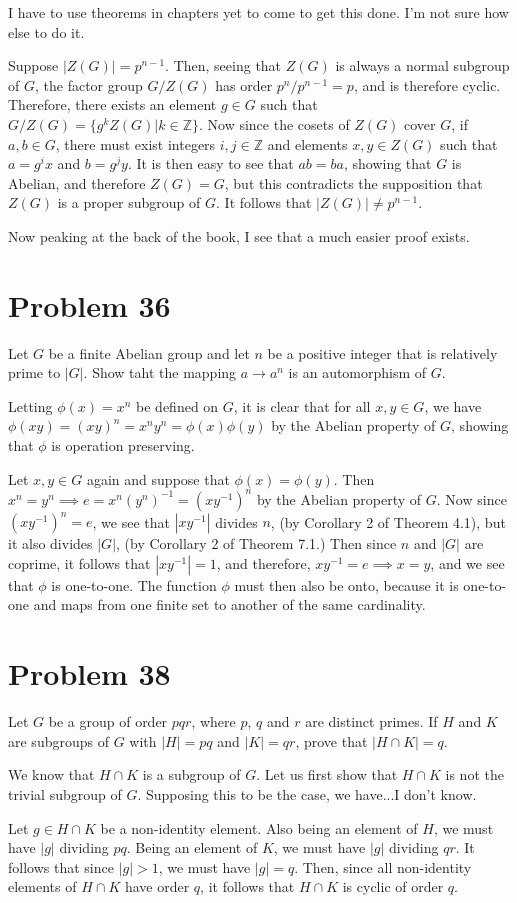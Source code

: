 \documentclass[12pt]{article}
\newcommand{\Z}{\mathbb{Z}}
\begin{document}
I have to use theorems in chapters yet to come to get this done.  I'm not sure
how else to do it.

Suppose $|Z(G)|=p^{n-1}$.  Then, seeing that $Z(G)$ is always
a normal subgroup of $G$, the factor group $G/Z(G)$ has
order $p^n/p^{n-1}=p$, and is therefore cyclic.
Therefore, there exists an element $g\in G$ such that $G/Z(G)=\{g^kZ(G)|k\in\Z\}$.
Now since the cosets of $Z(G)$ cover $G$, if $a,b\in G$, there must exist integers $i,j\in\Z$
and elements $x,y\in Z(G)$ such that $a=g^ix$ and $b=g^jy$.
It is then easy to see that $ab=ba$, showing that $G$ is
Abelian, and therefore $Z(G)=G$, but this contradicts the supposition that $Z(G)$ is a proper
subgroup of $G$.  It follows that $|Z(G)|\neq p^{n-1}$.

Now peaking at the back of the book, I see that a much easier
proof exists.

\section*{Problem 36}

Let $G$ be a finite Abelian group and let $n$ be a positive integer that is relatively prime to $|G|$.
Show taht the mapping $a\to a^n$ is an automorphism of $G$.

Letting $\phi(x)=x^n$ be defined on $G$, it is clear that for all $x,y\in G$,
we have $\phi(xy)=(xy)^n=x^ny^n=\phi(x)\phi(y)$ by the Abelian property
of $G$, showing that $\phi$ is operation preserving.

Let $x,y\in G$ again and suppose that $\phi(x)=\phi(y)$.
Then $x^n=y^n\implies e=x^n(y^n)^{-1}=(xy^{-1})^n$
by the Abelian property of $G$.  Now since $(xy^{-1})^n=e$,
we see that $|xy^{-1}|$ divides $n$, (by Corollary 2 of Theorem 4.1), but it also divides $|G|$, (by
Corollary 2 of Theorem 7.1.)
Then since $n$ and $|G|$ are coprime, it follows that $|xy^{-1}|=1$,
and therefore, $xy^{-1}=e\implies x=y$, and we see that
$\phi$ is one-to-one.  The function $\phi$ must then also be onto,
because it is one-to-one and maps from one finite set to another
of the same cardinality.

\section*{Problem 38}

Let $G$ be a group of order $pqr$, where $p$, $q$ and $r$ are distinct primes.
If $H$ and $K$ are subgroups of $G$ with $|H|=pq$ and $|K|=qr$, prove
that $|H\cap K|=q$.

We know that $H\cap K$ is a subgroup of $G$.  Let us first show
that $H\cap K$ is not the trivial subgroup of $G$.  Supposing this
to be the case, we have...I don't know.

Let $g\in H\cap K$ be a non-identity element.
Also being an element of $H$, we must have $|g|$ dividing $pq$.
Being an element of $K$, we must have $|g|$ dividing $qr$.
It follows that since $|g|>1$, we must have $|g|=q$.
Then, since all non-identity elements of $H\cap K$ have order $q$,
it follows that $H\cap K$ is cyclic of order $q$.
\end{document}

